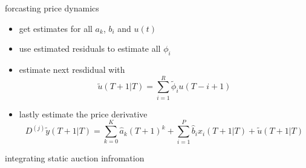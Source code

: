 \documentclass[hyperref={pdfpagelabels=false}]{beamer}
\begin{document}
\begin{frame}{forcasting price dynamics}
\begin{itemize}
	\item get estimates for all $a_k$, $b_i$ and $u(t)$
	\item use estimated residuals to estimate all $\phi_i$
	\item estimate next resdidual with \begin{equation}  \tilde{u}(T+1|T)=\sum_{i=1}^R\tilde{\phi}_iu(T-i+1) \nonumber \end{equation}
	\item lastly estimate the price derivative \begin{equation} D^{(j)}\tilde{y}(T+1|T) =\sum_{k=0}^K\hat{a}_k(T+1)^k+\sum_{i=1}^P\hat{b}_ix_i(T+1|T)+\tilde{u}(T+1|T) \nonumber \end{equation}
\end{itemize}	
\end{frame}

\begin{frame}{integrating static auction infromation}

\end{frame}

\begin{frame}

\end{frame}
\end{document}

